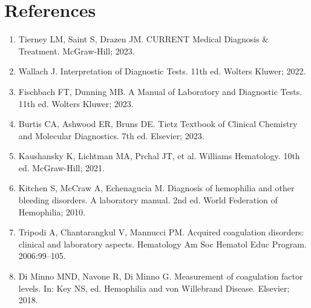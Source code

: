 \section*{References}
\begin{enumerate}
  \item Tierney LM, Saint S, Drazen JM. CURRENT Medical Diagnosis \& Treatment. McGraw-Hill; 2023.
  \item Wallach J. Interpretation of Diagnostic Tests. 11th ed. Wolters Kluwer; 2022.
  \item Fischbach FT, Dunning MB. A Manual of Laboratory and Diagnostic Tests. 11th ed. Wolters Kluwer; 2023.
  \item Burtis CA, Ashwood ER, Bruns DE. Tietz Textbook of Clinical Chemistry and Molecular Diagnostics. 7th ed. Elsevier; 2023.
  \item Kaushansky K, Lichtman MA, Prchal JT, et al. Williams Hematology. 10th ed. McGraw-Hill; 2021.
  \item Kitchen S, McCraw A, Echenagucia M. Diagnosis of hemophilia and other bleeding disorders. A laboratory manual. 2nd ed. World Federation of Hemophilia; 2010.
  \item Tripodi A, Chantarangkul V, Mannucci PM. Acquired coagulation disorders: clinical and laboratory aspects. Hematology Am Soc Hematol Educ Program. 2006:99--105.
  \item Di Minno MND, Navone R, Di Minno G. Measurement of coagulation factor levels. In: Key NS, ed. Hemophilia and von Willebrand Disease. Elsevier; 2018.
\end{enumerate}

\clearpage
